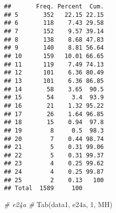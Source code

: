 \documentclass[
]{article}
\newenvironment{Shaded}{\begin{snugshade}}{\end{snugshade}}
\newcommand{\AttributeTok}[1]{\textcolor[rgb]{0.77,0.63,0.00}{#1}}
\newcommand{\CommentTok}[1]{\textcolor[rgb]{0.56,0.35,0.01}{\textit{#1}}}
\newcommand{\DecValTok}[1]{\textcolor[rgb]{0.00,0.00,0.81}{#1}}
\newcommand{\FunctionTok}[1]{\textcolor[rgb]{0.00,0.00,0.00}{#1}}
\newcommand{\NormalTok}[1]{#1}
\newcommand{\OtherTok}[1]{\textcolor[rgb]{0.56,0.35,0.01}{#1}}
\newcommand{\SpecialCharTok}[1]{\textcolor[rgb]{0.00,0.00,0.00}{#1}}
\newcommand{\StringTok}[1]{\textcolor[rgb]{0.31,0.60,0.02}{#1}}
\begin{document}
\begin{Shaded}
\end{Shaded}

\begin{verbatim}
##       Freq. Percent  Cum.
## 5       352   22.15 22.15
## 6       118    7.43 29.58
## 7       152    9.57 39.14
## 8       138    8.68 47.83
## 9       140    8.81 56.64
## 10      159   10.01 66.65
## 11      119    7.49 74.13
## 12      101    6.36 80.49
## 13      101    6.36 86.85
## 14       58    3.65  90.5
## 15       54     3.4  93.9
## 16       21    1.32 95.22
## 17       26    1.64 96.85
## 18       15    0.94  97.8
## 19        8     0.5  98.3
## 20        7    0.44 98.74
## 21        5    0.31 99.06
## 22        5    0.31 99.37
## 23        4    0.25 99.62
## 24        4    0.25 99.87
## 25        2    0.13   100
## Total  1589     100
\end{verbatim}

\begin{Shaded}
\begin{Highlighting}[]
\CommentTok{\# e24a \#}
\FunctionTok{Tab}\NormalTok{(data1, }\StringTok{\textquotesingle{}e24a\textquotesingle{}}\NormalTok{, }\DecValTok{1}\NormalTok{, }\StringTok{\textquotesingle{}MH\textquotesingle{}}\NormalTok{)}
\end{Highlighting}
\end{Shaded}
\end{document}
